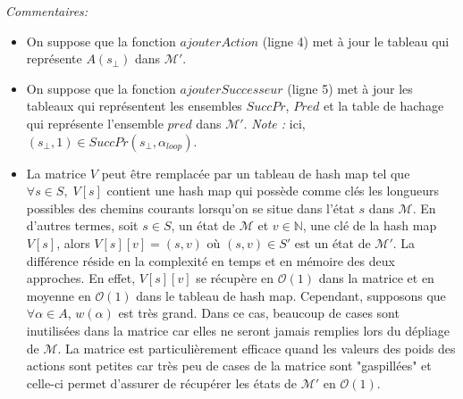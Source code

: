 \documentclass[12pt,a4paper]{report}
\theoremstyle{definition}%
\theoremstyle{remark}
\let\labelitemi\labelitemii
\begin{document}
\textit{Commentaires:}
\begin{itemize}
\renewcommand{\labelitemi}{\tiny$\bullet$}
	\item On suppose que la fonction $ajouterAction$ (ligne 4) met à jour le
		tableau qui représente $A(s_\bot)$ dans $\mathcal{M}'$.
	\item On suppose que la fonction $ajouterSuccesseur$ (ligne 5) met à jour les tableaux
		qui représentent les ensembles $SuccPr$, $Pred$ et la table de hachage qui représente l'ensemble $pred$ dans $\mathcal{M}'$.
		\textit{Note : }ici, $(s_\bot, 1) \in SuccPr(s_\bot, \alpha_{loop})$.
	\item La matrice $V$ peut être remplacée par un tableau de hash map tel que
		$\forall s \in S, \; V[s]$ contient une hash map qui possède comme clés les
		longueurs possibles des chemins courants lorsqu'on se situe dans l'état
		$s$ dans $\mathcal{M}$. En d'autres termes, soit $s \in S$, un état de $\mathcal{M}$ et $v \in \mathbb{N}$, une clé de la hash map $V[s]$, alors
		$V[s][v] = (s, v)$ où $(s, v) \in S'$ est un état de $\mathcal{M}'$.
		La différence réside en la complexité en temps et en
		mémoire des deux approches.
		En effet, $V[s][v]$ se récupère en $\mathcal{O}(1)$ dans la matrice et en
		moyenne en $\mathcal{O}(1)$ dans le tableau de hash map. Cependant, supposons que $\forall \alpha \in A$,
		$w(\alpha)$ est très grand. Dans ce cas, beaucoup de cases sont
		inutilisées dans la matrice car elles ne seront jamais remplies lors du
		dépliage de $\mathcal{M}$. La matrice est particulièrement efficace quand
		les valeurs des poids des actions sont petites car très peu de cases de la matrice sont "gaspillées" et celle-ci permet d'assurer de récupérer les états de $\mathcal{M}'$ en $\mathcal{O}(1)$.
\end{itemize}
\end{document}
